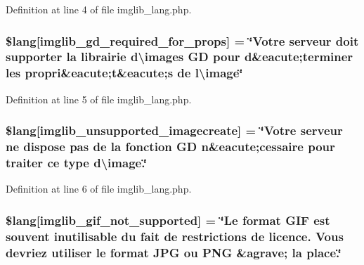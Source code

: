 Definition at line 4 of file imglib\+\_\+lang.\+php.

\subsubsection[{\texorpdfstring{\$lang}{$lang}}]{\setlength{\rightskip}{0pt plus 5cm}\$lang\mbox{[}\textquotesingle{}imglib\+\_\+gd\+\_\+required\+\_\+for\+\_\+props\textquotesingle{}\mbox{]} = \char`\"{}Votre serveur doit supporter la librairie d\textbackslash{}\textquotesingle{}images GD pour {\bf d}\&eacute;terminer les propri\&eacute;{\bf t}\&eacute;{\bf s} de l\textbackslash{}\textquotesingle{}image\char`\"{}}\hypertarget{application_2language_2french_2imglib__lang_8php_a0da9c99f9e2b5f38ccbefb9d9f702c5e}{}\label{application_2language_2french_2imglib__lang_8php_a0da9c99f9e2b5f38ccbefb9d9f702c5e}


Definition at line 5 of file imglib\+\_\+lang.\+php.

\subsubsection[{\texorpdfstring{\$lang}{$lang}}]{\setlength{\rightskip}{0pt plus 5cm}\$lang\mbox{[}\textquotesingle{}imglib\+\_\+unsupported\+\_\+imagecreate\textquotesingle{}\mbox{]} = \char`\"{}Votre serveur ne dispose pas de la fonction GD {\bf n}\&eacute;cessaire pour traiter ce {\bf type} d\textbackslash{}\textquotesingle{}image.\char`\"{}}\hypertarget{application_2language_2french_2imglib__lang_8php_ace032cbe8dafb1f3417a758d0914ecdb}{}\label{application_2language_2french_2imglib__lang_8php_ace032cbe8dafb1f3417a758d0914ecdb}


Definition at line 6 of file imglib\+\_\+lang.\+php.

\subsubsection[{\texorpdfstring{\$lang}{$lang}}]{\setlength{\rightskip}{0pt plus 5cm}\$lang\mbox{[}\textquotesingle{}imglib\+\_\+gif\+\_\+not\+\_\+supported\textquotesingle{}\mbox{]} = \char`\"{}Le format G\+IF est souvent inutilisable du fait de restrictions de licence. Vous devriez utiliser le format J\+PG ou P\+NG \&agrave; la place.\char`\"{}}\hypertarget{application_2language_2french_2imglib__lang_8php_a235a59a6660145fc136b3933b5b10675}{}\label{application_2language_2french_2imglib__lang_8php_a235a59a6660145fc136b3933b5b10675}


